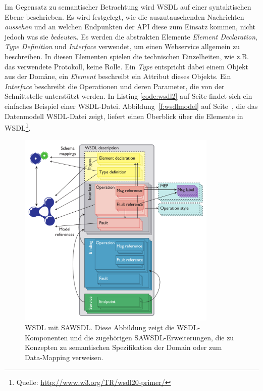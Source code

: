 Im Gegensatz zu semantischer Betrachtung wird \ac{WSDL} auf einer syntaktischen Ebene beschrieben. Es wird festgelegt, wie die auszutauschenden Nachrichten \emph{aussehen} und an welchen Endpunkten der \ac{API} diese zum Einsatz kommen, nicht jedoch was sie \emph{bedeuten}. Es werden die abstrakten Elemente \emph{Element Declaration}, \emph{Type Definition} und \emph{Interface} verwendet, um einen Webservice allgemein zu beschreiben. In diesen Elementen spielen die technischen Einzelheiten, wie z.B. das verwendete Protokoll, keine Rolle. Ein \emph{Type} entspricht dabei einem Objekt aus der Domäne, ein \emph{Element} beschreibt ein Attribut dieses Objekts. Ein \emph{Interface} beschreibt die Operationen und deren Parameter, die von der Schnittstelle unterstützt werden. In Listing \ref{code:wsdl2} auf Seite \pageref{code:wsdl2} findet sich ein einfaches Beispiel einer \ac{WSDL}-Datei. Abbildung~\ref{f:wsdlmodel} auf Seite~\pageref{f:wsdlmodel}, die das Datenmodell \ac{WSDL}-Datei zeigt, liefert einen Überblick über die Elemente in \ac{WSDL}\footnote{Quelle: \url{http://www.w3.org/TR/wsdl20-primer/}}.

\begin{figure}[ht]
\centering
\parbox{0.85\textwidth}{
    \includegraphics[width=0.85\textwidth]{media/sawsdl.png}
    \caption{\ac{WSDL} mit \ac{SAWSDL}. Diese Abbildung zeigt die \ac{WSDL}-Komponenten und die zugehörigen \ac{SAWSDL}-Erweiterungen, die zu Konzepten zu semantischen Spezifikation der Domain oder zum Data-Mapping verweisen. \cite[S.61]{ky-sawsdl}
}
    \label{f:sawsdl}
}
\end{figure}


